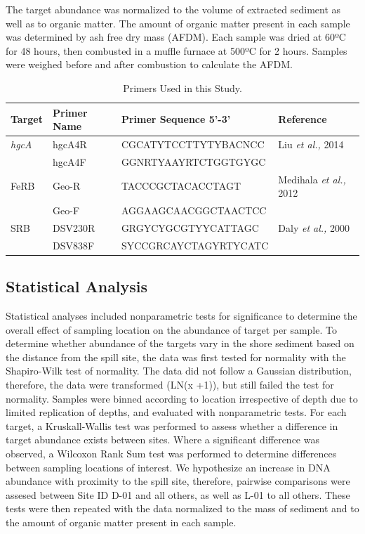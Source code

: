 \documentclass[ms, hidelinks]{uncgdissertationexp}
\theoremstyle{plain}
\theoremstyle{definition}
\theoremstyle{remark}
\begin{document}
The target abundance was normalized to the volume of extracted sediment as well as to organic matter. The amount of organic matter present in each sample was determined by ash free dry mass (AFDM). Each sample was dried at 60ºC for 48 hours, then combusted in a muffle furnace at 500ºC for 2 hours. Samples were weighed before and after combustion to calculate the AFDM.
\begin{table}[htbp]

\caption{\label{tab:primers}Primers Used in this Study.}
\centering
\begin{tabular}{llll}
\toprule
Target & Primer Name & Primer Sequence 5’-3’ & Reference\\
\midrule
\em{hgcA} & hgcA4R & CGCATYTCCTTYTYBACNCC & Liu \emph{et al.,} 2014\\
 & hgcA4F & GGNRTYAAYRTCTGGTGYGC & \\
FeRB & Geo-R & TACCCGCTACACCTAGT & Medihala \emph{et al.,} 2012\\
 & Geo-F & AGGAAGCAACGGCTAACTCC & \\
SRB & DSV230R & GRGYCYGCGTYYCATTAGC & Daly \emph{et al.,} 2000\\
 & DSV838F & SYCCGRCAYCTAGYRTYCATC & \\
\bottomrule
\end{tabular}
\end{table}
\hypertarget{statistical-analysis}{%
\subsection{Statistical Analysis}\label{statistical-analysis}}

Statistical analyses included nonparametric tests for significance to determine the overall effect of sampling location on the abundance of target per sample. To determine whether abundance of the targets vary in the shore sediment based on the distance from the spill site, the data was first tested for normality with the Shapiro-Wilk test of normality. The data did not follow a Gaussian distribution, therefore, the data were transformed (LN(x +1)), but still failed the test for normality. Samples were binned according to location irrespective of depth due to limited replication of depths, and evaluated with nonparametric tests. For each target, a Kruskall-Wallis test was performed to assess whether a difference in target abundance exists between sites. Where a significant difference was observed, a Wilcoxon Rank Sum test was performed to determine differences between sampling locations of interest. We hypothesize an increase in DNA abundance with proximity to the spill site, therefore, pairwise comparisons were assesed between Site ID D-01 and all others, as well as L-01 to all others. These tests were then repeated with the data normalized to the mass of sediment and to the amount of organic matter present in each sample.
\end{document}
